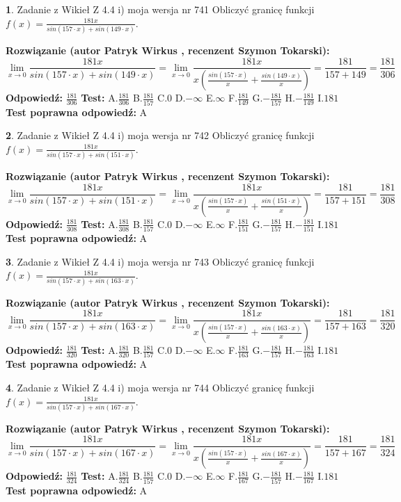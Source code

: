\documentclass[12pt, a4paper]{article}
\theoremstyle{definition} %
\newtheorem{zad}{}
\newcommand{\zadStart}[1]{\begin{zad}#1\newline}
\newcommand{\zadStop}{\end{zad}}
\newcommand{\rozwStart}[2]{\noindent \textbf{Rozwiązanie (autor #1 , recenzent #2): }\newline}
\newcommand{\rozwStop}{\newline}
\newcommand{\odpStart}{\noindent \textbf{Odpowiedź:}\newline}
\newcommand{\odpStop}{\newline}
\newcommand{\testStart}{\noindent \textbf{Test:}\newline}
\newcommand{\testStop}{\newline}
\newcommand{\kluczStart}{\noindent \textbf{Test poprawna odpowiedź:}\newline}
\newcommand{\kluczStop}{\newline}
\begin{document}
\zadStart{Zadanie z Wikieł Z 4.4 i) moja wersja nr 741}
Obliczyć granicę funkcji $f(x)=\frac{181x}{sin(157\cdot x) +sin(149\cdot x)}$.
\zadStop
\rozwStart{Patryk Wirkus}{Szymon Tokarski}
$$\lim\limits_{x\to 0}\frac{181x}{sin(157\cdot x) +sin(149\cdot x)}=\lim\limits_{x\to 0}\frac{181x}{x(\frac{sin(157\cdot x)}{x}+\frac{sin(149\cdot x)}{x})}=\frac{181}{157+149} = \frac{181}{306}$$
\rozwStop
\odpStart
$\frac{181}{306}$
\odpStop
\testStart
A.$\frac{181}{306}$
B.$\frac{181}{157}$
C.$0$
D.$-\infty$
E.$\infty$
F.$\frac{181}{149}$
G.$-\frac{181}{157}$
H.$-\frac{181}{149}$
I.$181$
\testStop
\kluczStart
A
\kluczStop



\zadStart{Zadanie z Wikieł Z 4.4 i) moja wersja nr 742}
Obliczyć granicę funkcji $f(x)=\frac{181x}{sin(157\cdot x) +sin(151\cdot x)}$.
\zadStop
\rozwStart{Patryk Wirkus}{Szymon Tokarski}
$$\lim\limits_{x\to 0}\frac{181x}{sin(157\cdot x) +sin(151\cdot x)}=\lim\limits_{x\to 0}\frac{181x}{x(\frac{sin(157\cdot x)}{x}+\frac{sin(151\cdot x)}{x})}=\frac{181}{157+151} = \frac{181}{308}$$
\rozwStop
\odpStart
$\frac{181}{308}$
\odpStop
\testStart
A.$\frac{181}{308}$
B.$\frac{181}{157}$
C.$0$
D.$-\infty$
E.$\infty$
F.$\frac{181}{151}$
G.$-\frac{181}{157}$
H.$-\frac{181}{151}$
I.$181$
\testStop
\kluczStart
A
\kluczStop



\zadStart{Zadanie z Wikieł Z 4.4 i) moja wersja nr 743}
Obliczyć granicę funkcji $f(x)=\frac{181x}{sin(157\cdot x) +sin(163\cdot x)}$.
\zadStop
\rozwStart{Patryk Wirkus}{Szymon Tokarski}
$$\lim\limits_{x\to 0}\frac{181x}{sin(157\cdot x) +sin(163\cdot x)}=\lim\limits_{x\to 0}\frac{181x}{x(\frac{sin(157\cdot x)}{x}+\frac{sin(163\cdot x)}{x})}=\frac{181}{157+163} = \frac{181}{320}$$
\rozwStop
\odpStart
$\frac{181}{320}$
\odpStop
\testStart
A.$\frac{181}{320}$
B.$\frac{181}{157}$
C.$0$
D.$-\infty$
E.$\infty$
F.$\frac{181}{163}$
G.$-\frac{181}{157}$
H.$-\frac{181}{163}$
I.$181$
\testStop
\kluczStart
A
\kluczStop



\zadStart{Zadanie z Wikieł Z 4.4 i) moja wersja nr 744}
Obliczyć granicę funkcji $f(x)=\frac{181x}{sin(157\cdot x) +sin(167\cdot x)}$.
\zadStop
\rozwStart{Patryk Wirkus}{Szymon Tokarski}
$$\lim\limits_{x\to 0}\frac{181x}{sin(157\cdot x) +sin(167\cdot x)}=\lim\limits_{x\to 0}\frac{181x}{x(\frac{sin(157\cdot x)}{x}+\frac{sin(167\cdot x)}{x})}=\frac{181}{157+167} = \frac{181}{324}$$
\rozwStop
\odpStart
$\frac{181}{324}$
\odpStop
\testStart
A.$\frac{181}{324}$
B.$\frac{181}{157}$
C.$0$
D.$-\infty$
E.$\infty$
F.$\frac{181}{167}$
G.$-\frac{181}{157}$
H.$-\frac{181}{167}$
I.$181$
\testStop
\kluczStart
A
\kluczStop
\end{document}
